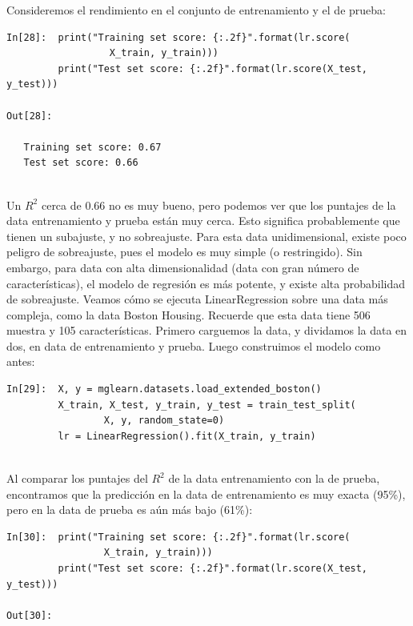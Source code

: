 { Consideremos el rendimiento en el conjunto de entrenamiento y el de prueba: \\

\begin{lstlisting}
In[28]:  print("Training set score: {:.2f}".format(lr.score(
                  X_train, y_train)))
         print("Test set score: {:.2f}".format(lr.score(X_test, y_test)))

Out[28]:

   Training set score: 0.67
   Test set score: 0.66
   
\end{lstlisting}



Un $R^{2}$ cerca de 0.66 no es muy bueno, pero podemos ver que los puntajes de la data
entrenamiento y  prueba están muy cerca. Esto significa probablemente que tienen un subajuste, 
y no sobreajuste.  Para esta data unidimensional, existe poco peligro de sobreajuste, pues el modelo es muy simple (o restringido). Sin embargo, para data con alta dimensionalidad (data con gran número de características), el modelo de regresión es más potente, y existe alta probabilidad de sobreajuste. Veamos cómo se ejecuta  {\ttfamily LinearRegression} sobre una data más compleja, como la data  Boston Housing.
Recuerde que esta data  tiene 506 muestra y 105 características. Primero carguemos la data, y dividamos la data en dos, en data de entrenamiento y prueba. Luego construimos el modelo como antes:\\


\begin{lstlisting}
In[29]:  X, y = mglearn.datasets.load_extended_boston()
         X_train, X_test, y_train, y_test = train_test_split(
                 X, y, random_state=0)
         lr = LinearRegression().fit(X_train, y_train)
    
\end{lstlisting}     
         
Al comparar los puntajes del $R^{2}$ de la data entrenamiento con la de prueba, encontramos que la predicción en la data de entrenamiento es muy exacta (95\%), pero  en la data de prueba es aún más bajo (61\%):\\


\begin{lstlisting}
In[30]:  print("Training set score: {:.2f}".format(lr.score(
                 X_train, y_train)))
         print("Test set score: {:.2f}".format(lr.score(X_test, y_test)))

Out[30]:
 

\end{lstlisting}}
